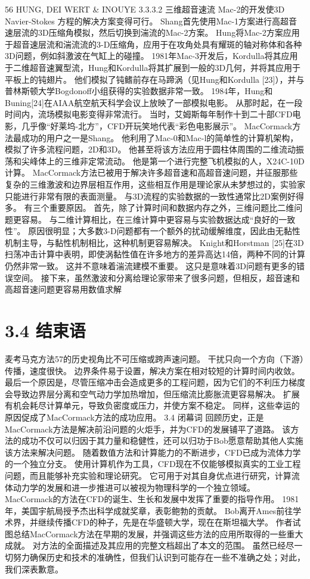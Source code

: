 \documentclass[UTF8,11pt,a4paper,openany,fontset=fandol]{ctexbook}
\begin{document}
56 HUNG, DEI WERT \& INOUYE 3.3.3.2 三维超音速流 Mac-2的开发使3D Navier-Stokes 方程的解决方案变得可行。 Shang首先使用Mac-1方案进行高超音速层流的3D压缩角模拟，然后切换到湍流的Mac-2方案。 Hung将Mac-2方案应用于超音速层流和湍流流的3-D压缩角，应用于在攻角处具有耀斑的轴对称体和各种3D问题，例如斜激波在气缸上的碰撞。 1981年Mac-3开发后，Kordulla将其应用于二维超音速翼型流，Hung和Kordulla将其扩展到一般的3D几何，并将其应用于平板上的钝翅片。 他们模拟了钝鳍前存在马蹄涡（见Hung和Kordulla [23]），并与普林斯顿大学Bogdonoff小组获得的实验数据非常一致。 1984年，Hung和Buning[24]在AIAA航空航天科学会议上放映了一部模拟电影。 从那时起，在一段时间内，流场模拟电影变得非常流行。 当时，艾姆斯每年制作十到二十部CFD电影，几乎像“好莱坞-北方”，CFD开玩笑地代表“彩色电影展示”。 MacCormack方法最成功的用户之一是Shang。 他利用了Mac-0和Mac-l的简单性的计算机架构，模拟了许多流程问题，2D和3D。 他甚至将该方法应用于圆柱体周围的二维流动振荡和尖峰体上的三维非定常流动。 他是第一个进行完整飞机模拟的人，X24C-10D计算。 MacCormack方法已被用于解决许多超音速和高超音速问题，并征服那些复杂的三维激波和边界层相互作用，这些相互作用是理论家从未梦想过的，实验家只能进行非常有限的表面测量。 与3D流程的实验数据的一致性通常比2D案例好得多。 有三个重要原因。 首先，除了计算时间和数据内存之外，三维问题比二维问题更容易。 与二维计算相比，在三维计算中更容易与实验数据达成“良好的一致性”。 原因很明显；大多数3-D问题都有一个额外的扰动缓解维度，因此由无黏性机制主导，与黏性机制相比，这种机制更容易解决。 Knight和Horstman [25]在3D扫荡冲击计算中表明，即使涡黏性值在许多地方的差异高达14倍，两种不同的计算仍然非常一致。 这并不意味着湍流建模不重要。 这只是意味着3D问题有更多的错误空间。 接下来，虽然激波和分离给理论家带来了很多问题，但相反，超音速和高超音速问题更容易用数值求解

\section{3.4 结束语}
麦考马克方法57的历史视角比不可压缩或跨声速问题。 干扰只向一个方向（下游）传播，速度很快。 边界条件易于设置，解决方案在相对较短的计算时间内收敛。 最后一个原因是，尽管压缩冲击会造成更多的工程问题，因为它们的不利压力梯度会导致边界层分离和空气动力学加热增加，但压缩流比膨胀流更容易解决。 扩展有机会耗尽计算单元，导致负密度或压力，并使方案不稳定。 同样，这些幸运的原因促成了MacCormack方法的成功应用。 3.4 闭幕词 回顾历史，正是MacCormack方法是解决前沿问题的火炬手，并为CFD的发展铺平了道路。 该方法的成功不仅可以归因于其力量和稳健性，还可以归功于Bob愿意帮助其他人实施该方法来解决问题。 随着数值方法和计算能力的不断进步，CFD已成为流体力学的一个独立分支。 使用计算机作为工具，CFD现在不仅能够模拟真实的工业工程问题，而且能够补充实验和理论研究。 它可用于对其自身优点进行研究，计算流体动力学的发展和进一步推进可以被视为物理科学的一个独立领域。 MacCormack的方法在CFD的诞生、生长和发展中发挥了重要的指导作用。 1981年，美国宇航局授予杰出科学成就奖章，表彰鲍勃的贡献。 Bob离开Ames前往学术界，并继续传播CFD的种子，先是在华盛顿大学，现在在斯坦福大学。 作者试图总结MacCormack方法在早期的发展，并强调这些方法的应用所取得的一些重大成就。 对方法的全面描述及其应用的完整文档超出了本文的范围。 虽然已经尽一切努力确保历史和技术的准确性，但我们认识到可能存在一些不准确之处；对此，我们深表歉意。
\end{document}
